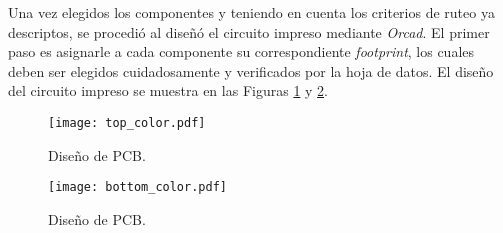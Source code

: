 Una vez elegidos los componentes y teniendo en cuenta los criterios de ruteo ya descriptos, se procedió al diseñó el circuito impreso mediante \textit{Orcad}. El primer paso es asignarle a cada componente su correspondiente \textit{footprint}, los cuales deben ser elegidos cuidadosamente y verificados por la hoja de datos. El diseño del circuito impreso se muestra en las Figuras \ref{fig.pcb_top} y \ref{fig.pcb_bottom}. 

\begin{figure}[H]
	\centering
	\texttt{[image: top\_color.pdf]}
	\caption{Diseño de PCB.}
	\label{fig.pcb_top}
\end{figure}

\begin{figure}[H]
	\centering
	\texttt{[image: bottom\_color.pdf]}
	\caption{Diseño de PCB.}
	\label{fig.pcb_bottom}
\end{figure}

